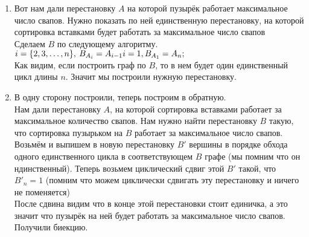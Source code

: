 \documentclass[a4paper, 10pt]{article}
\begin{document}
\begin{enumerate}
{\begin{enumerate}
        \item{
            Вот нам дали перестановку $A$ на которой пузырёк работает максимальное число свапов. Нужно показать по ней единственную перестановку, на которой сортировка вставками будет работать за максимальное число свапов\\
            Сделаем $B$ по следующему алгоритму.\\
            $
            i = \{2, 3, \ldots, n\}, \medspace B_{A_i} = A_{i-1}\\
            i = 1, B_{A_1} = A_n;
            $\\
            Как видим, если построить граф по $B$, то в нем будет один единственный цикл длины $n$. Значит мы построили нужную перестановку.
        }

        \item {
            В одну сторону построили, теперь построим в обратную.\\
            Нам дали перестановку $A$, на которой сортировка вставками работает за максимальное количество свапов. Нам нужно найти перестановку $B$ такую, что сортировка пузырьком на $B$ работает за максимальное число свапов.\\
            Возьмём и выпишем в новую перестановку $B'$ вершины в порядке обхода одного единственного цикла в соответствующем $B$ графе (мы помним что он ндинственный). Теперь возьмем циклический сдвиг этой $B'$ такой, что $B'_n = 1$ (помним что можем циклически сдвигать эту перестановку и ничего не поменяется)\\
            После сдвина видим что в конце этой перестановки стоит единичка, а это значит что пузырёк на ней будет работать за максимальное число свапов.\\
            Получили биекцию.
        }
        
        \end{enumerate}
    }


\end{enumerate}
\end{document}
